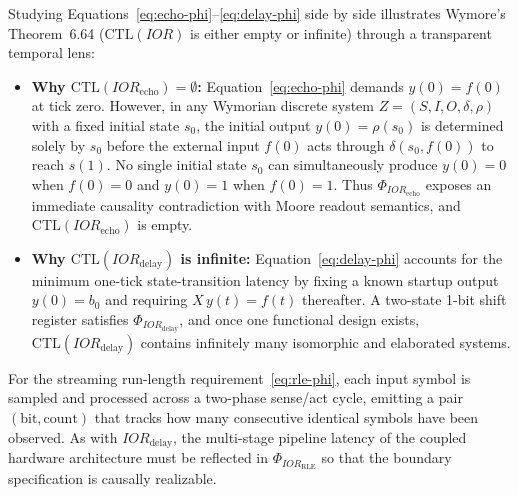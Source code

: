 Studying Equations~\eqref{eq:echo-phi}--\eqref{eq:delay-phi} side by side illustrates Wymore's Theorem~6.64 ($\mathrm{CTL}(IOR)$ is either empty or infinite) through a transparent temporal lens:
\begin{itemize}
    \item \textbf{Why $\mathrm{CTL}(IOR_{\mathrm{echo}})=\emptyset$:} Equation~\eqref{eq:echo-phi} demands $y(0)=f(0)$ at tick zero. However, in any Wymorian discrete system $Z=(S,I,O,\delta,\rho)$ with a fixed initial state $s_0$, the initial output $y(0)=\rho(s_0)$ is determined solely by $s_0$ before the external input $f(0)$ acts through $\delta(s_0,f(0))$ to reach $s(1)$. No single initial state $s_0$ can simultaneously produce $y(0)=0$ when $f(0)=0$ and $y(0)=1$ when $f(0)=1$. Thus $\Phi_{IOR_{\mathrm{echo}}}$ exposes an immediate causality contradiction with Moore readout semantics, and $\mathrm{CTL}(IOR_{\mathrm{echo}})$ is empty.
    \item \textbf{Why $\mathrm{CTL}(IOR_{\mathrm{delay}})$ is infinite:} Equation~\eqref{eq:delay-phi} accounts for the minimum one-tick state-transition latency by fixing a known startup output $y(0)=b_0$ and requiring $X\,y(t)=f(t)$ thereafter. A two-state 1-bit shift register satisfies $\Phi_{IOR_{\mathrm{delay}}}$, and once one functional design exists, $\mathrm{CTL}(IOR_{\mathrm{delay}})$ contains infinitely many isomorphic and elaborated systems.
\end{itemize}
For the streaming run-length requirement~\eqref{eq:rle-phi}, each input symbol is sampled and processed across a two-phase sense/act cycle, emitting a pair $(\text{bit},\text{count})$ that tracks how many consecutive identical symbols have been observed. As with $IOR_{\mathrm{delay}}$, the multi-stage pipeline latency of the coupled hardware architecture must be reflected in $\Phi_{IOR_{\mathrm{RLE}}}$ so that the boundary specification is causally realizable.

